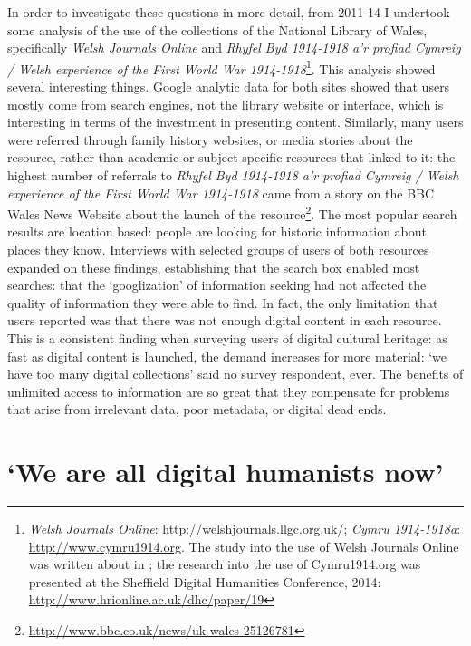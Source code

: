 \documentclass[amsthm,ebook]{saparticle}
\begin{document}
In order to investigate these questions in more detail, from 2011-14 I undertook some analysis of the use of the collections of the National Library of Wales, specifically \emph{Welsh Journals Online} and \emph{Rhyfel Byd 1914-1918 a’r profiad Cymreig / Welsh experience of the First World War 1914-1918}\footnote{\emph{Welsh Journals Online}: \url{http://welshjournals.llgc.org.uk/}; \emph{Cymru 1914-1918a}: \url{http://www.cymru1914.org}. The study into the use of Welsh Journals Online was written about in \citet{Hughes:2012aa}; the research into the use of Cymru1914.org was presented at the Sheffield Digital Humanities Conference, 2014: \url{http://www.hrionline.ac.uk/dhc/paper/19}}. This analysis showed several interesting things. Google analytic data for both sites showed that users mostly come from search engines, not the library website or interface, which is interesting in terms of the investment in presenting content. Similarly, many users were referred through family history websites, or media stories about the resource, rather than academic or subject-specific resources that linked to it: the highest number of referrals to \emph{Rhyfel Byd 1914-1918 a’r profiad Cymreig / Welsh experience of the First World War 1914-1918} came from a story on the BBC Wales News Website about the launch of the resource\footnote{\url{http://www.bbc.co.uk/news/uk-wales-25126781}}. The most popular search results are location based: people are looking for historic information about places they know. Interviews with selected groups of users of both resources expanded on these findings, establishing that the search box enabled most searches: that the `googlization' of information seeking had not affected the quality of information they were able to find. In fact, the only limitation that users reported was that there was not enough digital content in each resource. This is a consistent finding when surveying users of digital cultural heritage: as fast as digital content is launched, the demand increases for more material: `we have too many digital collections' said no survey respondent, ever. The benefits of unlimited access to information are so great that they compensate for problems that arise from irrelevant data, poor metadata, or digital dead ends. 

\section{`We are all digital humanists now'}
\end{document}
